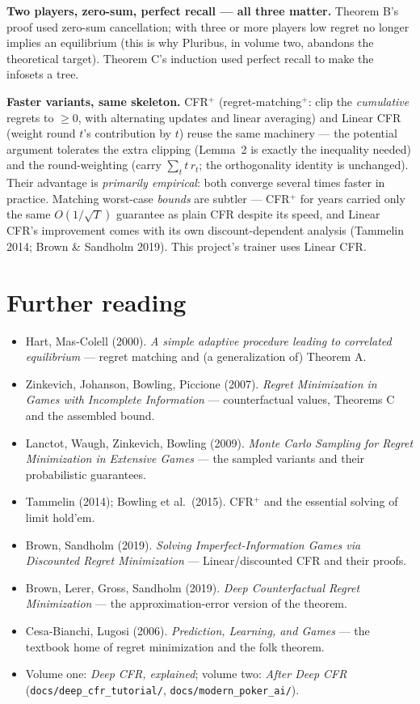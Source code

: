 \documentclass[11pt,a4paper]{article}
\begin{document}
\textbf{Two players, zero-sum, perfect recall --- all three matter.}
Theorem B's proof used zero-sum cancellation; with three or more players
low regret no longer implies an equilibrium (this is why Pluribus, in volume
two, abandons the theoretical target). Theorem C's induction used perfect
recall to make the infosets a tree.

\textbf{Faster variants, same skeleton.} CFR$^{+}$ (regret-matching$^{+}$:
clip the \emph{cumulative} regrets to $\ge 0$, with alternating updates and
linear averaging) and Linear CFR (weight round $t$'s contribution by $t$)
reuse the same machinery --- the potential argument tolerates the extra
clipping (Lemma~2 is exactly the inequality needed) and the round-weighting
(carry $\sum_t t\,r_t$; the orthogonality identity is unchanged). Their
advantage is \emph{primarily empirical}: both converge several times faster in
practice. Matching worst-case \emph{bounds} are subtler --- CFR$^{+}$ for years
carried only the same $O(1/\sqrt{T})$ guarantee as plain CFR despite its speed,
and Linear CFR's improvement comes with its own discount-dependent analysis
(Tammelin 2014; Brown \& Sandholm 2019). This project's trainer uses Linear CFR.

\section{Further reading}

\begin{itemize}[leftmargin=1.4em, itemsep=1pt]
\item Hart, Mas-Colell (2000). \emph{A simple adaptive procedure leading to
  correlated equilibrium} --- regret matching and (a generalization of)
  Theorem A.
\item Zinkevich, Johanson, Bowling, Piccione (2007). \emph{Regret
  Minimization in Games with Incomplete Information} --- counterfactual
  values, Theorems C and the assembled bound.
\item Lanctot, Waugh, Zinkevich, Bowling (2009). \emph{Monte Carlo Sampling
  for Regret Minimization in Extensive Games} --- the sampled variants and
  their probabilistic guarantees.
\item Tammelin (2014); Bowling et al.\ (2015). CFR$^{+}$ and the essential
  solving of limit hold'em.
\item Brown, Sandholm (2019). \emph{Solving Imperfect-Information Games via
  Discounted Regret Minimization} --- Linear/discounted CFR and their proofs.
\item Brown, Lerer, Gross, Sandholm (2019). \emph{Deep Counterfactual Regret
  Minimization} --- the approximation-error version of the theorem.
\item Cesa-Bianchi, Lugosi (2006). \emph{Prediction, Learning, and Games} ---
  the textbook home of regret minimization and the folk theorem.
\item Volume one: \emph{Deep CFR, explained}; volume two: \emph{After Deep
  CFR} (\texttt{docs/deep\_cfr\_tutorial/}, \texttt{docs/modern\_poker\_ai/}).
\end{itemize}
\end{document}
